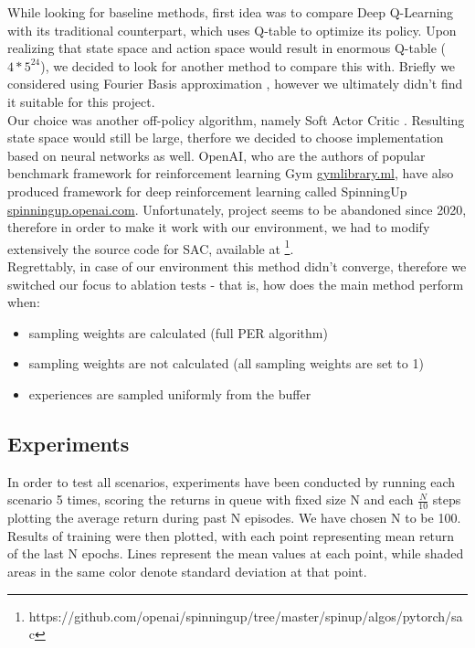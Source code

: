 \documentclass[a4paper,11pt]{article}
\theoremstyle{definition}
\begin{document}
While looking for baseline methods, first idea was to compare Deep Q-Learning with its traditional counterpart, which uses Q-table to optimize its policy. Upon realizing that state space and action space would result in enormous Q-table ($4*5^{24}$), we decided to look for another method to compare this with. Briefly we considered using Fourier Basis approximation \cite{ziemke_2020}, however we ultimately didn't find it suitable for this project.\\
Our choice was another off-policy algorithm, namely Soft Actor Critic \cite{haarnoja_2018}. Resulting state space would still be large, therfore we decided to choose implementation based on neural networks as well. OpenAI, who are the authors of popular benchmark framework for reinforcement learning Gym \url{gymlibrary.ml}, have also produced framework for deep reinforcement learning called SpinningUp \url{spinningup.openai.com}. Unfortunately, project seems to be abandoned since 2020, therefore in order to make it work with our environment, we had to modify extensively the source code for SAC, available at \footnote{https://github.com/openai/spinningup/tree/master/spinup/algos/pytorch/sac}. \\
Regrettably, in case of our environment this method didn't converge, therefore we switched our focus to ablation tests - that is, how does the main method perform when:

\begin{itemize}
    \item sampling weights are calculated (full PER algorithm)
    \item sampling weights are not calculated (all sampling weights are set to 1)
    \item experiences are sampled uniformly from the buffer
\end{itemize}

\subsection{Experiments}
\label{sec:experiments}
In order to test all scenarios, experiments have been conducted by running each scenario 5 times, scoring the returns in queue with fixed size N and each $\frac{N}{10}$ steps plotting the average return during past N episodes. We have chosen N to be 100.\\
Results of training were then plotted, with each point representing mean return of the last N epochs. Lines represent the mean values at each point, while shaded areas in the same color denote standard deviation at that point.\\
\end{document}
